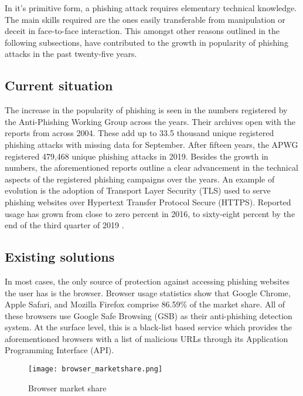 In it's primitive form, a phishing attack requires elementary technical
knowledge. The main skills required are the ones easily transferable from
manipulation or deceit in face-to-face interaction. This amongst other reasons
outlined in the following subsections, have contributed to the growth in
popularity of phishing attacks in the past twenty-five years.

\subsection{Current situation}
The increase in the popularity of phishing is seen in the numbers registered by the
Anti-Phishing Working Group \citep{APWG} across the years. Their archives open
with the reports from across 2004. These add up to 33.5 thousand unique registered phishing attacks with missing data for September. After fifteen years, the \gls{APWG} registered
479,468 unique phishing attacks in 2019. Besides the growth in numbers, the
aforementioned reports outline a clear advancement in the technical aspects of
the registered phishing campaigns over the years. An example of evolution is the
adoption of Transport Layer Security (\gls{TLS}) used to serve phishing websites over
Hypertext Transfer Protocol Secure (\gls{HTTPS}). Reported usage has grown from close to zero percent in 2016, to sixty-eight percent by the end of the third quarter of 2019 \citep{APWG_Q42019}.

\subsection{Existing solutions}
In most cases, the only source of protection against accessing phishing websites
the user has is the browser. Browser usage statistics show that Google
Chrome, Apple Safari, and Mozilla Firefox comprise 86.59\% \citep{STATCOUNTER} of the market share. All of these browsers use Google Safe Browsing (\gls{GSB}) as their anti-phishing detection
system. At the surface level, this is a black-list based service which provides
the aforementioned browsers with a list of malicious URLs through its
Application Programming Interface (\gls{API}).

\begin{figure}[t]
	\centering
	\texttt{[image: browser\_marketshare.png]}
	\caption{Browser market share \citep{STATCOUNTER}}
	\label{fig:BROWSER_MARKETSHARE}
\end{figure}

